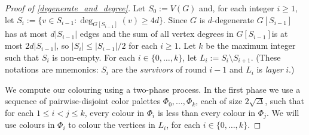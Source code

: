 \documentclass{patmorin}
\newcommand{\defin}[1]{\emph{\color{brightmaroon}#1}}
\begin{document}
\begin{proof}[Proof of \cref{degenerate_and_degree}]
  Let $S_0:=V(G)$ and, for each integer $i\ge 1$, let $S_i:=\{v\in S_{i-1}:\deg_{G[S_{i-1}]}(v)\ge 4d\}$.  Since $G$ is $d$-degenerate $G[S_{i-1}]$ has at most $d|S_{i-1}|$ edges and the sum of all vertex degrees in $G[S_{i-1}]$is at most $2d|S_{i-1}|$, so $|S_i|\le |S_{i-1}|/2$ for each $i\ge 1$.  Let $k$ be the maximum integer such that $S_i$ is non-empty.  For each $i\in\{0,\ldots,k\}$, let $L_i:=S_i\setminus S_{i+1}$.  (These notations are mnemonics: $S_i$ are the \defin{survivors} of round $i-1$ and $L_i$ is \defin{layer} $i$.)


  We compute our colouring using a two-phase process. In the first phase we use a sequence of pairwise-disjoint color palettes $\Phi_0,\ldots,\Phi_{k}$, each of size $2\sqrt{\Delta}$, such that for each $1\le i < j\le k$, every colour in $\Phi_i$ is less than every colour in $\Phi_j$.  We will use colours in $\Phi_i$ to colour the vertices in $L_i$, for each $i\in\{0,\ldots,k\}$.



\end{proof}
\end{document}
